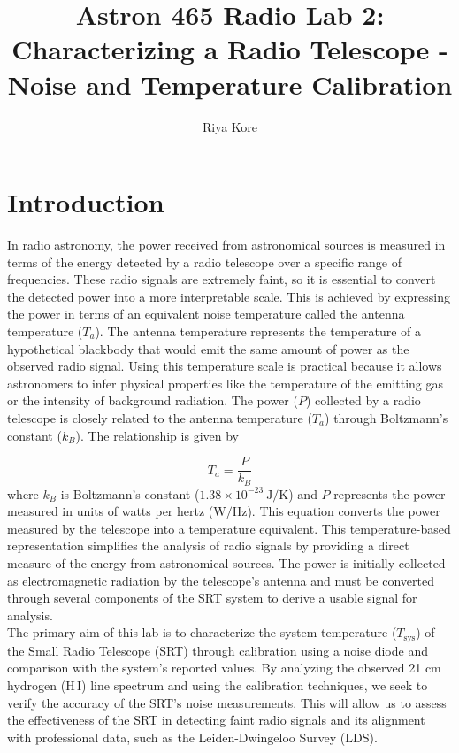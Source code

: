 \documentclass[linenumbers,twocolumn]{aastex631}
\newcommand{\hi}{{\rm H\,{\small I}}}
\begin{document}
\title{Astron 465 Radio Lab 2: Characterizing a Radio Telescope - Noise and Temperature Calibration}

\author[0000-0002-3418-7817]{Riya Kore}

\section{Introduction}

In radio astronomy, the power received from astronomical sources is measured in terms of the energy detected by a radio telescope over a specific range of frequencies. These radio signals are extremely faint, so it is essential to convert the detected power into a more interpretable scale. This is achieved by expressing the power in terms of an equivalent noise temperature called the antenna temperature ($T_{a}$). The antenna temperature represents the temperature of a hypothetical blackbody that would emit the same amount of power as the observed radio signal. Using this temperature scale is practical because it allows astronomers to infer physical properties like the temperature of the emitting gas or the intensity of background radiation. The power ($P$) collected by a radio telescope is closely related to the antenna temperature ($T_{a}$) through Boltzmann's constant ($k_{B}$). The relationship is given by

\[
T_{a} = \frac{P}{k_{B}}
\]
where $k_{B}$ is Boltzmann's constant ($1.38 \times 10^{-23} \ \text{J/K}$) and $P$ represents the power measured in units of watts per hertz ($\text{W/Hz}$). This equation converts the power measured by the telescope into a temperature equivalent. This temperature-based representation simplifies the analysis of radio signals by providing a direct measure of the energy from astronomical sources. The power is initially collected as electromagnetic radiation by the telescope’s antenna and must be converted through several components of the SRT system to derive a usable signal for analysis. \\

The primary aim of this lab is to characterize the system temperature ($T_{\text{sys}}$) of the Small Radio Telescope (SRT) through calibration using a noise diode and comparison with the system's reported values. By analyzing the observed 21 cm hydrogen (\hi) line spectrum and using the calibration techniques, we seek to verify the accuracy of the SRT's noise measurements. This will allow us to assess the effectiveness of the SRT in detecting faint radio signals and its alignment with professional data, such as the Leiden-Dwingeloo Survey (LDS).
\end{document}
